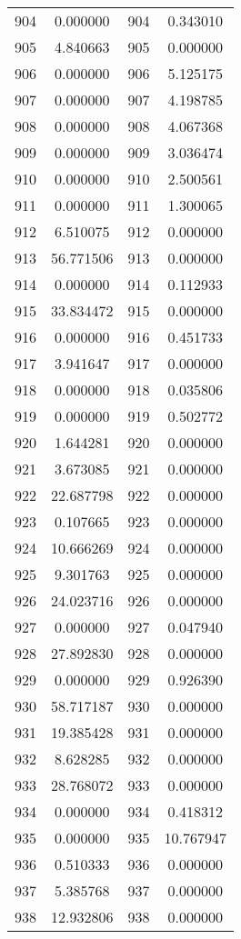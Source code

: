 \documentclass[12pt]{article}
\begin{document}
\begin{longtable}{@{}cccc@{}}
904 & 0.000000 & 904 & 0.343010 \\
905 & 4.840663 & 905 & 0.000000 \\
906 & 0.000000 & 906 & 5.125175 \\
907 & 0.000000 & 907 & 4.198785 \\
908 & 0.000000 & 908 & 4.067368 \\
909 & 0.000000 & 909 & 3.036474 \\
910 & 0.000000 & 910 & 2.500561 \\
911 & 0.000000 & 911 & 1.300065 \\
912 & 6.510075 & 912 & 0.000000 \\
913 & 56.771506 & 913 & 0.000000 \\
914 & 0.000000 & 914 & 0.112933 \\
915 & 33.834472 & 915 & 0.000000 \\
916 & 0.000000 & 916 & 0.451733 \\
917 & 3.941647 & 917 & 0.000000 \\
918 & 0.000000 & 918 & 0.035806 \\
919 & 0.000000 & 919 & 0.502772 \\
920 & 1.644281 & 920 & 0.000000 \\
921 & 3.673085 & 921 & 0.000000 \\
922 & 22.687798 & 922 & 0.000000 \\
923 & 0.107665 & 923 & 0.000000 \\
924 & 10.666269 & 924 & 0.000000 \\
925 & 9.301763 & 925 & 0.000000 \\
926 & 24.023716 & 926 & 0.000000 \\
927 & 0.000000 & 927 & 0.047940 \\
928 & 27.892830 & 928 & 0.000000 \\
929 & 0.000000 & 929 & 0.926390 \\
930 & 58.717187 & 930 & 0.000000 \\
931 & 19.385428 & 931 & 0.000000 \\
932 & 8.628285 & 932 & 0.000000 \\
933 & 28.768072 & 933 & 0.000000 \\
934 & 0.000000 & 934 & 0.418312 \\
935 & 0.000000 & 935 & 10.767947 \\
936 & 0.510333 & 936 & 0.000000 \\
937 & 5.385768 & 937 & 0.000000 \\
938 & 12.932806 & 938 & 0.000000 \\

\end{longtable}
\end{document}
